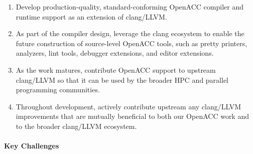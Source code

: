 \begin{enumerate}

\item Develop production-quality, standard-conforming OpenACC compiler
and runtime support as an extension of clang/LLVM.

\item As part of the compiler design, leverage the clang ecosystem to enable
the future construction of source-level OpenACC tools, such as pretty
printers, analyzers, lint tools, debugger extensions, and editor extensions.

\item As the work matures, contribute OpenACC support to upstream clang/LLVM
so that it can be used by the broader HPC and parallel programming
communities.

\item Throughout development, actively contribute upstream any clang/LLVM
improvements that are mutually beneficial to both our OpenACC work and to
the broader clang/LLVM ecosystem.


\end{enumerate}


\paragraph{Key Challenges}

